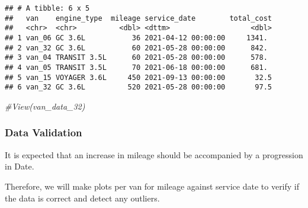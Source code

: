 \documentclass[
]{article}
\newenvironment{Shaded}{\begin{snugshade}}{\end{snugshade}}
\newcommand{\CommentTok}[1]{\textcolor[rgb]{0.56,0.35,0.01}{\textit{#1}}}
\begin{document}
\begin{verbatim}
## # A tibble: 6 x 5
##   van    engine_type  mileage service_date        total_cost
##   <chr>  <chr>          <dbl> <dttm>                   <dbl>
## 1 van_06 GC 3.6L           36 2021-04-12 00:00:00     1341. 
## 2 van_32 GC 3.6L           60 2021-05-28 00:00:00      842. 
## 3 van_04 TRANSIT 3.5L      60 2021-05-28 00:00:00      578. 
## 4 van_05 TRANSIT 3.5L      70 2021-06-18 00:00:00      681. 
## 5 van_15 VOYAGER 3.6L     450 2021-09-13 00:00:00       32.5
## 6 van_32 GC 3.6L          520 2021-05-28 00:00:00       97.5
\end{verbatim}

\begin{Shaded}
\begin{Highlighting}[]
\CommentTok{\#View(van\_data\_32)}
\end{Highlighting}
\end{Shaded}

\hypertarget{data-validation}{%
\subsubsection{Data Validation}\label{data-validation}}

It is expected that an increase in mileage should be accompanied by a
progression in Date.

Therefore, we will make plots per van for mileage against service date
to verify if the data is correct and detect any outliers.
\end{document}
